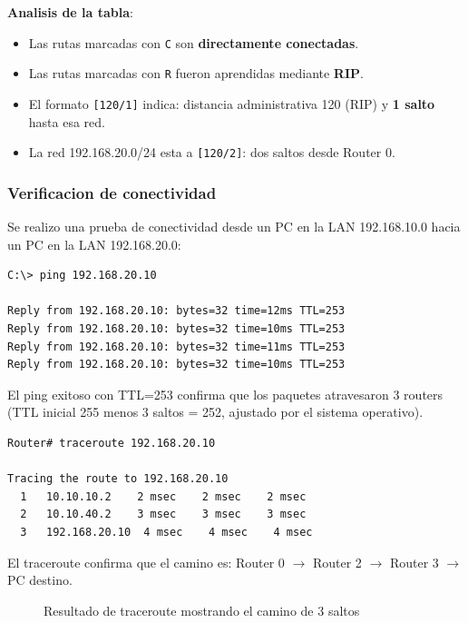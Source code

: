 \textbf{Analisis de la tabla}:
\begin{itemize}
    \item Las rutas marcadas con \texttt{C} son \textbf{directamente conectadas}.
    \item Las rutas marcadas con \texttt{R} fueron aprendidas mediante \textbf{RIP}.
    \item El formato \texttt{[120/1]} indica: distancia administrativa 120 (RIP) y
    \textbf{1 salto} hasta esa red.
    \item La red 192.168.20.0/24 esta a \texttt{[120/2]}: dos saltos desde Router 0.
\end{itemize}

\subsubsection{Verificacion de conectividad}

Se realizo una prueba de conectividad desde un PC en la LAN 192.168.10.0 hacia
un PC en la LAN 192.168.20.0:

\begin{lstlisting}[language=bash,caption={Ping desde LAN 192.168.10.0 hacia LAN 192.168.20.0},label={lst:ping-interlan}]
C:\> ping 192.168.20.10

Reply from 192.168.20.10: bytes=32 time=12ms TTL=253
Reply from 192.168.20.10: bytes=32 time=10ms TTL=253
Reply from 192.168.20.10: bytes=32 time=11ms TTL=253
Reply from 192.168.20.10: bytes=32 time=10ms TTL=253
\end{lstlisting}

El ping exitoso con TTL=253 confirma que los paquetes atravesaron 3 routers (TTL
inicial 255 menos 3 saltos = 252, ajustado por el sistema operativo).

\begin{lstlisting}[language=bash,caption={Traceroute desde Router 0 hacia 192.168.20.10},label={lst:traceroute}]
Router# traceroute 192.168.20.10

Tracing the route to 192.168.20.10
  1   10.10.10.2    2 msec    2 msec    2 msec
  2   10.10.40.2    3 msec    3 msec    3 msec
  3   192.168.20.10  4 msec    4 msec    4 msec
\end{lstlisting}

El traceroute confirma que el camino es: Router 0 $\rightarrow$ Router 2
$\rightarrow$ Router 3 $\rightarrow$ PC destino.

\begin{figure}[H]
\centering
{}
\caption{Resultado de traceroute mostrando el camino de 3 saltos}
\label{fig:traceroute}
\end{figure}


